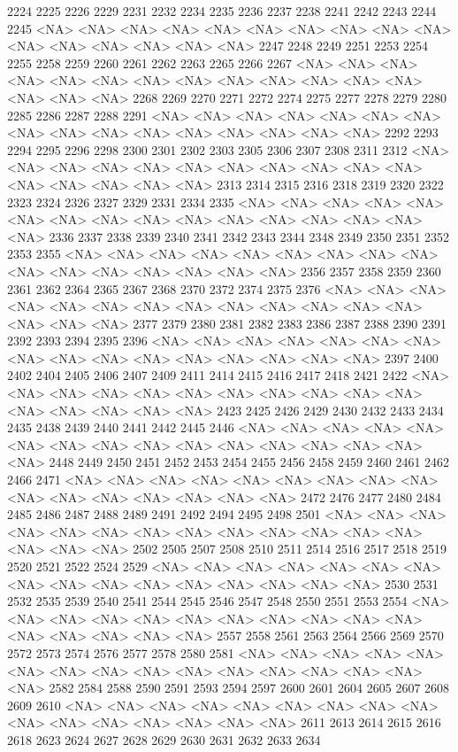 \documentclass{article}
\begin{document}
\begin{Schunk}
\begin{Soutput}
2224 2225 2226 2229 2231 2232 2234 2235 2236 2237 2238 2241 2242 2243 2244 2245 
<NA> <NA> <NA> <NA> <NA> <NA> <NA> <NA> <NA> <NA> <NA> <NA> <NA> <NA> <NA> <NA> 
2247 2248 2249 2251 2253 2254 2255 2258 2259 2260 2261 2262 2263 2265 2266 2267 
<NA> <NA> <NA> <NA> <NA> <NA> <NA> <NA> <NA> <NA> <NA> <NA> <NA> <NA> <NA> <NA> 
2268 2269 2270 2271 2272 2274 2275 2277 2278 2279 2280 2285 2286 2287 2288 2291 
<NA> <NA> <NA> <NA> <NA> <NA> <NA> <NA> <NA> <NA> <NA> <NA> <NA> <NA> <NA> <NA> 
2292 2293 2294 2295 2296 2298 2300 2301 2302 2303 2305 2306 2307 2308 2311 2312 
<NA> <NA> <NA> <NA> <NA> <NA> <NA> <NA> <NA> <NA> <NA> <NA> <NA> <NA> <NA> <NA> 
2313 2314 2315 2316 2318 2319 2320 2322 2323 2324 2326 2327 2329 2331 2334 2335 
<NA> <NA> <NA> <NA> <NA> <NA> <NA> <NA> <NA> <NA> <NA> <NA> <NA> <NA> <NA> <NA> 
2336 2337 2338 2339 2340 2341 2342 2343 2344 2348 2349 2350 2351 2352 2353 2355 
<NA> <NA> <NA> <NA> <NA> <NA> <NA> <NA> <NA> <NA> <NA> <NA> <NA> <NA> <NA> <NA> 
2356 2357 2358 2359 2360 2361 2362 2364 2365 2367 2368 2370 2372 2374 2375 2376 
<NA> <NA> <NA> <NA> <NA> <NA> <NA> <NA> <NA> <NA> <NA> <NA> <NA> <NA> <NA> <NA> 
2377 2379 2380 2381 2382 2383 2386 2387 2388 2390 2391 2392 2393 2394 2395 2396 
<NA> <NA> <NA> <NA> <NA> <NA> <NA> <NA> <NA> <NA> <NA> <NA> <NA> <NA> <NA> <NA> 
2397 2400 2402 2404 2405 2406 2407 2409 2411 2414 2415 2416 2417 2418 2421 2422 
<NA> <NA> <NA> <NA> <NA> <NA> <NA> <NA> <NA> <NA> <NA> <NA> <NA> <NA> <NA> <NA> 
2423 2425 2426 2429 2430 2432 2433 2434 2435 2438 2439 2440 2441 2442 2445 2446 
<NA> <NA> <NA> <NA> <NA> <NA> <NA> <NA> <NA> <NA> <NA> <NA> <NA> <NA> <NA> <NA> 
2448 2449 2450 2451 2452 2453 2454 2455 2456 2458 2459 2460 2461 2462 2466 2471 
<NA> <NA> <NA> <NA> <NA> <NA> <NA> <NA> <NA> <NA> <NA> <NA> <NA> <NA> <NA> <NA> 
2472 2476 2477 2480 2484 2485 2486 2487 2488 2489 2491 2492 2494 2495 2498 2501 
<NA> <NA> <NA> <NA> <NA> <NA> <NA> <NA> <NA> <NA> <NA> <NA> <NA> <NA> <NA> <NA> 
2502 2505 2507 2508 2510 2511 2514 2516 2517 2518 2519 2520 2521 2522 2524 2529 
<NA> <NA> <NA> <NA> <NA> <NA> <NA> <NA> <NA> <NA> <NA> <NA> <NA> <NA> <NA> <NA> 
2530 2531 2532 2535 2539 2540 2541 2544 2545 2546 2547 2548 2550 2551 2553 2554 
<NA> <NA> <NA> <NA> <NA> <NA> <NA> <NA> <NA> <NA> <NA> <NA> <NA> <NA> <NA> <NA> 
2557 2558 2561 2563 2564 2566 2569 2570 2572 2573 2574 2576 2577 2578 2580 2581 
<NA> <NA> <NA> <NA> <NA> <NA> <NA> <NA> <NA> <NA> <NA> <NA> <NA> <NA> <NA> <NA> 
2582 2584 2588 2590 2591 2593 2594 2597 2600 2601 2604 2605 2607 2608 2609 2610 
<NA> <NA> <NA> <NA> <NA> <NA> <NA> <NA> <NA> <NA> <NA> <NA> <NA> <NA> <NA> <NA> 
2611 2613 2614 2615 2616 2618 2623 2624 2627 2628 2629 2630 2631 2632 2633 2634 

\end{Soutput}
\end{Schunk}
\end{document}

